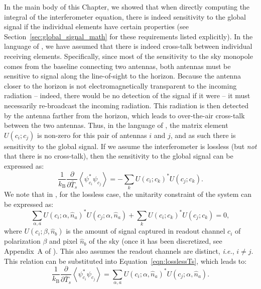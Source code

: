 In the main body of this Chapter, we showed that when directly computing the
integral of the interferometer equation, there is indeed sensitivity to the
global signal if the individual elements have certain properties (see
Section~\ref{sec:global_signal_math} for these requirements listed explicitly). In the
language of \citealt{Venumadhav.16}, we have assumed that there is indeed cross-talk between
individual receiving elements. Specifically, since most of the sensitivity to
the sky monopole comes from the baseline connecting two antennas, both antennas
must be sensitive to signal along the line-of-sight to the horizon. Because the
antenna closer to the horizon is not electromagnetically transparent to the
incoming radiation -- indeed, there would be no detection of the signal if it
were -- it must necessarily re-broadcast the incoming radiation. This radiation
is then detected by the antenna farther from the horizon, which leads to
over-the-air cross-talk between the two antennas. Thus, in the language of \citealt{Venumadhav.16},
the matrix element $U(c_i; c_j)$ is non-zero for this pair of antennas $i$ and
$j$, and as such there is sensitivity to the global signal. If we assume the
interferometer is lossless (but \textit{not} that there is no cross-talk), then
the sensitivity to the global signal can be expressed as:
\begin{equation}
\frac{1}{k_\mathrm{B}} \frac{\partial}{\partial\bar{T}_s} \left\langle\psi_{c_i}^* \psi_{c_j}\right\rangle =
- \sum_k U(c_i; c_k)^* U(c_j; c_k). 
\label{eqn:losslessTs}
\end{equation}
We note that in \citealt{Venumadhav.16}, for the lossless case, the unitarity constraint of the
system can be expressed as:
\begin{equation}
\sum_{\alpha,a} U(c_i; \alpha, \hat{n}_a)^* U(c_j; \alpha, \hat{n}_a) + \sum_k U(c_i; c_k)^* U(c_j; c_k) = 0,
\end{equation}
where $U(c_i; \beta, \hat{n}_b)$ is the amount of signal captured in readout
channel $c_i$ of polarization $\beta$ and pixel $\hat{n}_b$ of the sky (once it
has been discretized, see Appendix~A of \citealt{Venumadhav.16}). This also assumes the readout
channels are distinct, \textit{i.e.}, $i \neq j$. This relation can be
substituted into Equation~\ref{eqn:losslessTs}, which leads to:
\begin{equation}
\frac{1}{k_\mathrm{B}} \frac{\partial}{\partial\bar{T}_s} \left\langle\psi_{c_i}^* \psi_{c_j}\right\rangle =
\sum_{\alpha, a} U(c_i; \alpha, \hat{n}_a)^* U(c_j; \alpha, \hat{n}_a).
\label{eqn:skyTs}
\end{equation}
